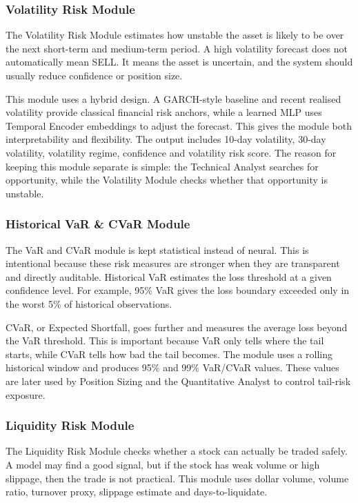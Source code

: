 \documentclass[conference]{IEEEtran}
\begin{document}
\subsubsection{Volatility Risk Module}
The Volatility Risk Module estimates how unstable the asset is likely to be over the next short-term and medium-term period. A high volatility forecast does not automatically mean SELL. It means the asset is uncertain, and the system should usually reduce confidence or position size.

This module uses a hybrid design. A GARCH-style\cite{GARCH} baseline and recent realised volatility provide classical financial risk anchors, while a learned MLP uses Temporal Encoder embeddings to adjust the forecast. This gives the module both interpretability and flexibility. The output includes 10-day volatility, 30-day volatility, volatility regime, confidence and volatility risk score. The reason for keeping this module separate is simple: the Technical Analyst searches for opportunity, while the Volatility Module checks whether that opportunity is unstable.

\subsubsection{Historical VaR \& CVaR Module}
The VaR and CVaR module is kept statistical instead of neural. This is intentional because these risk measures are stronger when they are transparent and directly auditable. Historical VaR estimates the loss threshold at a given confidence level. For example, 95\% VaR gives the loss boundary exceeded only in the worst 5\% of historical observations.

CVaR, or Expected Shortfall, goes further and measures the average loss beyond the VaR threshold. This is important because VaR only tells where the tail starts, while CVaR tells how bad the tail becomes. The module uses a rolling historical window and produces 95\% and 99\% VaR/CVaR values. These values are later used by Position Sizing and the Quantitative Analyst to control tail-risk exposure.

\subsubsection{Liquidity Risk Module}
The Liquidity Risk Module checks whether a stock can actually be traded safely. A model may find a good signal, but if the stock has weak volume or high slippage, then the trade is not practical. This module uses dollar volume, volume ratio, turnover proxy, slippage estimate and days-to-liquidate.
\end{document}
